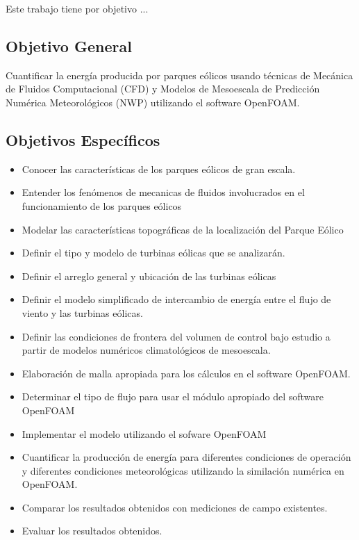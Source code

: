 Este trabajo tiene por objetivo ...



\subsection{Objetivo General}

Cuantificar la energía producida por parques eólicos usando técnicas de Mecánica de Fluidos Computacional (CFD) y Modelos de Mesoescala de Predicción Numérica  Meteorológicos (NWP) utilizando el software OpenFOAM.

\subsection{Objetivos Específicos}

\begin{itemize}
\item Conocer las características de los parques eólicos de gran escala.
\item Entender los fenómenos de mecanicas de fluidos involucrados en el funcionamiento de los parques eólicos
\item Modelar las características topográficas de la localización del Parque Eólico
\item Definir el tipo y modelo de turbinas eólicas que se analizarán.
\item Definir el arreglo general y ubicación de las turbinas eólicas
\item Definir el modelo simplificado  de intercambio de energía entre el flujo de viento y las turbinas eólicas. 
\item Definir las condiciones de frontera del volumen de control bajo estudio a partir de modelos numéricos climatológicos de mesoescala.
\item Elaboración de malla apropiada para los cálculos en el software OpenFOAM.
\item Determinar el tipo de flujo para usar el módulo apropiado del software OpenFOAM
\item Implementar el modelo utilizando el sofware OpenFOAM
\item Cuantificar la producción de energía para diferentes condiciones de operación y diferentes condiciones meteorológicas utilizando la similación numérica en OpenFOAM.
\item Comparar los resultados obtenidos con mediciones de campo existentes.
\item Evaluar los resultados obtenidos.
\end{itemize}


